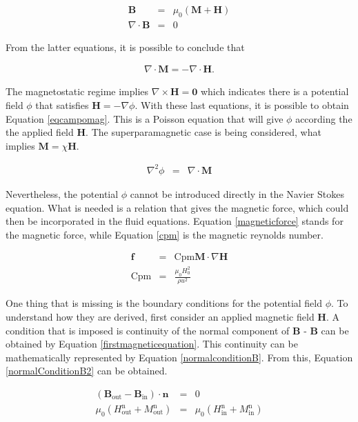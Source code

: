 \documentclass[journal]{IEEEtran}
\begin{document}
\begin{eqnarray}
\mathbf{B} &=& \mu_0(\mathbf{M}+\mathbf{H})\label{firstmagneticequation}\\
\nabla\cdot \mathbf{B} & = & 0\label{secondmagneticequation}
\end{eqnarray}

From the latter equations, it is possible to conclude that 

\begin{eqnarray}
\nabla\cdot \mathbf{M} = -\nabla\cdot\mathbf{H}	\label{mh1}.
\end{eqnarray}

The magnetostatic regime implies $\nabla\times \mathbf{H} = \mathbf{0}$ which indicates there is a potential field $\phi$ that satisfies $\mathbf{H} = -\nabla \phi$. With these last equations, it is possible to obtain Equation \ref{eqcampomag}. This is a Poisson equation that will give $\phi$ according the the applied field $\mathbf{H}$. The superparamagnetic case is being considered, what implies $\mathbf{M} = \chi \mathbf{H}$.

\begin{eqnarray}
\nabla^2\phi &=& \nabla\cdot \mathbf{M}\label{eqcampomag}
\end{eqnarray}

Nevertheless, the potential $\phi$ cannot be introduced directly in the Navier Stokes equation. What is needed is a relation that gives the magnetic force, which could then be incorporated in the fluid equations. Equation \ref{magneticforce} stands for the magnetic force, while Equation \ref{cpm} is the magnetic reynolds number.

\begin{eqnarray}
\mathbf{f} & = & \mathrm{Cpm} \mathbf{M}\cdot \nabla \mathbf{H}\label{magneticforce}\\
\mathrm{Cpm} & = & \frac{\mu_0 H_0^2}{\rho u^2}\label{cpm}
\end{eqnarray}


One thing that is missing is the boundary conditions for the potential field $\phi$. To understand how they are derived, first consider an applied magnetic field $\mathbf{H}$. A condition that is imposed is continuity of the normal component of $\mathbf{B}$ - $\mathbf{B}$ can be obtained by Equation \ref{firstmagneticequation}. This continuity can be mathematically represented by Equation \ref{normalconditionB}. From this, Equation \ref{normalConditionB2} can be obtained.

\begin{eqnarray}
\left(\mathbf{B}_{\mathrm{out}} - \mathbf{B}_{\mathrm{in}}\right)\cdot \mathbf{n} &=& 0 \label{normalconditionB}\\
\mu_0 (H_{\mathrm{out}}^{\mathrm{n}} + M_{\mathrm{out}}^{\mathrm{n}}) &=&  \mu_0(H_{\mathrm{in}}^{\mathrm{n}}+M_{\mathrm{in}}^{\mathrm{n}})\label{normalConditionB2}
\end{eqnarray}
\end{document}

